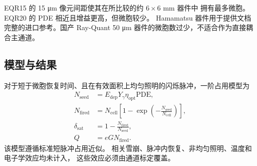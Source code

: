 \documentclass[UTF8,10pt,letterpaper,fontset=none]{ctexart}
\begin{document}
EQR15 的 15 \si{\micro\meter} 像元间距使其在所比较的约 $6\times6$ mm 器件中
拥有最多微胞。EQR20 的 PDE 相近且增益更高，但微胞较少。
Hamamatsu 器件用于提供文档完整的进口参考。国产 Ray-Quant 50
\si{\micro\meter} 器件的微胞数过少，不适合作为直接耦合主通道。

\subsection{模型与结果}

对于短于微胞恢复时间、且在有效面积上均匀照明的闪烁脉冲，一阶占用模型为
\begin{align}
  N_{\mathrm{seed}} &= E_{\mathrm{dep}}Y_\gamma\eta_{\mathrm{opt}}\mathrm{PDE},\\
  N_{\mathrm{fired}} &= N_{\mathrm{cell}}
  \left[1-\exp\left(-\frac{N_{\mathrm{seed}}}{N_{\mathrm{cell}}}\right)\right],\\
  \delta_{\mathrm{sat}} &= 1-\frac{N_{\mathrm{fired}}}{N_{\mathrm{seed}}},\\
  Q &= eG N_{\mathrm{fired}}.
\end{align}
该模型遵循标准短脉冲占用近似\cite{hamamatsu_occupancy}。
相关雪崩、脉冲内恢复、非均匀照明、温度和电子学效应均未计入，
这些效应必须由通道标定覆盖。
\end{document}
